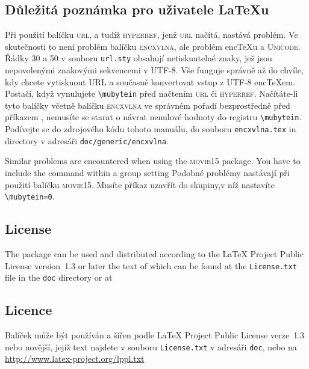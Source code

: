 \subsection{\texorpdfstring{Důležitá poznámka pro uživatele}{Dulezita poznamka pro uzivatele}
\LaTeX u}
Při použití balíčku \textsc{url}, a tudíž \textsc{hyperref}, jenž \textsc{url} načítá, nastává
problém. Ve skutečnosti to není problém balíčku \textsc{encxvlna}, ale problém enc\TeX{}u a
\textsc{Unicode}. Řádky 30 a 50 v souboru \texttt{url.sty} obsahují netisknutelné znaky, jež jsou
nepovolenými znakovými sekvencemi v UTF-8. Vše funguje správně až do chvíle, kdy chcete vytisknout
URL a současně konvertovat vstup z UTF-8 enc\TeX em. Postačí, když vynulujete \verb;\mubytein;
před načtením \textsc{url} či \textsc{hyperref}. Načítáte-li tyto balíčky včetně balíčku
\textsc{encxvlna} ve správném pořadí bezprostředně před příkazem \verb;;, nemusíte se starat o
návrat nenulové hodnoty do registru \verb;\mubytein;. Podívejte se do zdrojového kódu tohoto
manuálu, do souboru
\fi
\texttt{encxvlna.tex}
\ifeng
in directory
\else
v adresáři
\fi
\texttt{doc/generic/encxvlna}.


\ifeng
Similar problems are encountered when using the \textsc{movie15} package. You have to include the
 command within a group setting 
\else
Podobné problémy nastávají při použití balíčku \textsc{movie15}. Musíte příkaz  uzavřít do
skupiny,v níž nastavíte
\fi
\verb;\mubytein=0;.


\ifeng
\subsection{License}
The package can be used and distributed according to the LaTeX Project Public License version~1.3 or later the
text of which can be found at the \texttt{License.txt} file in the \texttt{doc} directory or at
\else

\subsection{Licence}
Balíček může být používán a šířen podle LaTeX Project Public License verze~1.3 nebo novější, jejíž text najdete
v souboru \texttt{License.txt} v adresáři \texttt{doc}, nebo na
\fi
\url{http://www.latex-project.org/lppl.txt}

